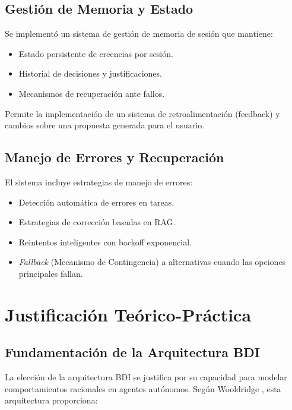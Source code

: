 \documentclass[runningheads,a4paper]{llncs}
\begin{document}
\subsection{Gestión de Memoria y Estado}

Se implementó un sistema de gestión de memoria de sesión que mantiene:

\begin{itemize}
    \item Estado persistente de creencias por sesión.
    \item Historial de decisiones y justificaciones.
    \item Mecanismos de recuperación ante fallos.
\end{itemize}

Permite la implementación de un sistema de retroalimentación (feedback) y cambios sobre una propuesta generada para el 
usuario.

\subsection{Manejo de Errores y Recuperación}

El sistema incluye estrategias de manejo de errores:

\begin{itemize}
    \item Detección automática de errores en tareas.
    \item Estrategias de corrección basadas en RAG.
    \item Reintentos inteligentes con backoff exponencial.
    \item \textit{Fallback} (Mecanismo de Contingencia) a alternativas cuando las opciones principales fallan.
\end{itemize}

\section{Justificación Teórico-Práctica}

\subsection{Fundamentación de la Arquitectura BDI}

La elección de la arquitectura BDI se justifica por su capacidad para modelar comportamientos racionales en agentes 
autónomos. Según Wooldridge \cite{wooldridge2009introduction}, esta arquitectura proporciona:
\end{document}
